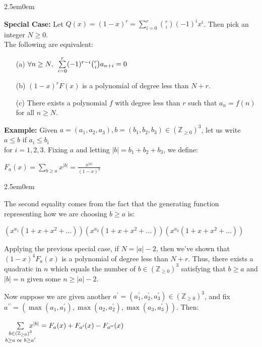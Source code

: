 \documentclass{book}
\newcommand{\exOne}{%
   \color{Purple}%
   \fontsize{13}{15}\selectfont%
}
\newcommand{\exTwoP}{%
   \color{RedViolet}%
   \fontsize{13}{15}\selectfont%
}
\newenvironment{myIndent}{%
   \begin{adjustwidth}{2.5em}{0em}%
}{%
   \end{adjustwidth}%
}
\newcommand{\blab}[1]{\textbf{#1}}
\newcommand{\pprime}{{\prime\prime}}
\newcommand{\myHS}{ \hspace{0.5em}}
\newcommand{\retTwo}{\hfill\bigbreak}
\begin{document}
\begin{myIndent}
   \blab{Special Case:} Let $Q(x) = (1 - x)^r = \sum\limits_{i=0}^r \binom{r}{i}(-1)^i x^i$. Then pick an integer $N \geq 0$.\\ [-8pt] The following are equivalent:
  \begin{enumerate}
      \item[(a)] $\forall n \geq N, \myHS \sum\limits_{i=0}^r(-1)^{r-i}\binom{r}{i}a_{n+i} = 0$
      \item[(b)] $(1 - x)^rF(x)$ is a polynomial of degree less than $N + r$. 
      \item[(c)] There exists a polynomial $f$ with degree less than $r$ such that $a_n = f(n)$ for all $n \geq N$.\newpage 
   \end{enumerate} 
\end{myIndent}

\exOne

\blab{Example:} Given $a = (a_1, a_2, a_3), b = (b_1, b_2, b_3) \in (\mathbb{Z}_{\geq 0})^3$, let us write $a \leq b$ if $a_i \leq b_i$\\ for $i = 1,2,3$. Fixing $a$ and letting $|b| = b_1 + b_2 + b_3$, we define:

{\centering $F_a(x) = \sum\limits_{b \geq a}x^{|b|} = \frac{x^{|a|}}{(1-x)^3}$ \retTwo\par}


\begin{myIndent}\exTwoP
   The second equality comes from the fact that the generating function representing how we are choosing $b \geq a$ is:

   {\centering $(x^{a_1}(1 + x + x^2 + \ldots))(x^{a_2}(1 + x + x^2 + \ldots))(x^{a_3}(1 + x + x^2 + \ldots))$ \retTwo\par}
\end{myIndent}

Applying the previous special case, if $N = |a| - 2$, then we've shown that $(1 - x)^4F_a(x)$ is a polynomial of degree less than $N + r$. Thus, there exists a quadratic in $n$ which equals the number of $b \in (\mathbb{Z}_{\geq 0})^3$ satisfying that $b \geq a$ and $|b| = n$ given some $n \geq |a| - 2$. \retTwo

Now suppose we are given another $a^\prime = (a_1^\prime, a_2^\prime, a_3^\prime) \in (\mathbb{Z}_{\geq 0})^3$, and fix\\ $a^\pprime = (\max(a_1, a_1^\prime), \max(a_2, a_2^\prime), \max(a_3, a_3^\prime))$. Then:\\ [-6pt]

{\centering $\sum\limits_{
\begin{smallmatrix}
   b \in (\mathbb{Z}_{\geq 0})^3 \\ b \geq a \text{ or } b \geq a^\prime
\end{smallmatrix}}\hspace{-1.25em} x^{|b|} = F_a(x) + F_{a^\prime}(x) - F_{a^\pprime}(x)$\retTwo\par}
\end{document}

